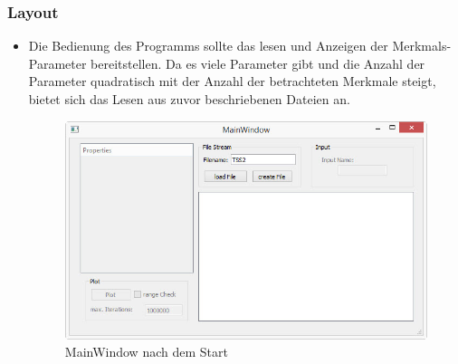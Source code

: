 \documentclass{article}
\begin{document}
		\subsubsection{Layout}
		\begin{itemize}
			\item Die Bedienung des Programms sollte das lesen und Anzeigen der Merkmals-Parameter bereitstellen. Da es viele Parameter gibt und die Anzahl der Parameter quadratisch mit der Anzahl der betrachteten Merkmale steigt, bietet sich das Lesen aus zuvor beschriebenen Dateien an.
			\begin{figure}[H]
				\centering
				\includegraphics[width=0.7\linewidth]{./Pictures/MainWindow_Start}
				\caption[Startwindow]{MainWindow nach dem Start}
				\label{MainWindow_Start}
			\end{figure}


\end{itemize}
\end{document}
